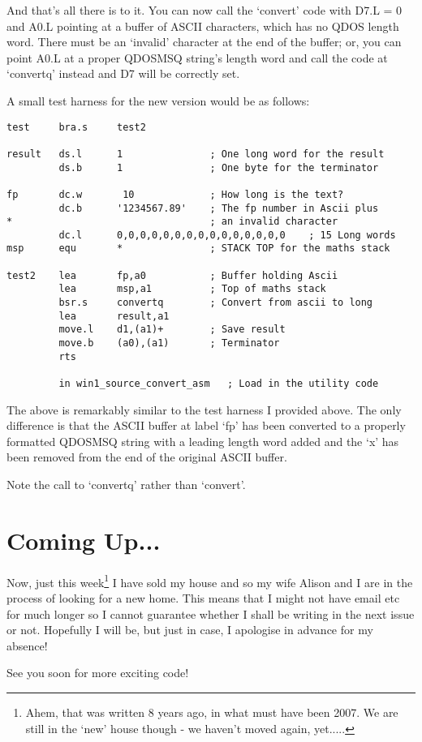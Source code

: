 And that's all there is to it. You can now call the `convert' code with D7.L = 0 and A0.L
pointing at a buffer of ASCII characters, which has no QDOS length word. There must be an `invalid' character at the end of the buffer; or, you can point A0.L at a proper QDOSMSQ string's length word and call the code at `convertq' instead and D7 will be correctly set.

A small test harness for the new version would be as follows:

\begin{lstlisting}[firstnumber=1,caption={Better ASCII to LONG Converter - Test Harness}]
test     bra.s     test2

result   ds.l      1               ; One long word for the result
         ds.b      1               ; One byte for the terminator

fp       dc.w       10             ; How long is the text?
         dc.b      '1234567.89'    ; The fp number in Ascii plus 
*                                  ; an invalid character
         dc.l      0,0,0,0,0,0,0,0,0,0,0,0,0,0,0    ; 15 Long words 
msp      equ       *               ; STACK TOP for the maths stack

test2    lea       fp,a0           ; Buffer holding Ascii
         lea       msp,a1          ; Top of maths stack
         bsr.s     convertq        ; Convert from ascii to long
         lea       result,a1
         move.l    d1,(a1)+        ; Save result
         move.b    (a0),(a1)       ; Terminator
         rts

         in win1_source_convert_asm   ; Load in the utility code
\end{lstlisting}

The above is remarkably similar to the test harness I provided above. The only difference
is that the ASCII buffer at label `fp' has been converted to a properly formatted QDOSMSQ
string with a leading length word added and the `x' has been removed from the end of the
original ASCII buffer.

Note the call to `convertq' rather than `convert'.

\section{Coming Up...}
\label{ch18-the-end}%

Now, just this week\footnote{Ahem, that was written 8 years ago, in what must have been 2007. We are still in the `new' house though - we haven't moved again, yet.....} I have sold my house and so my wife Alison and I are in the
process of looking for a new home. This means that I might not have email etc
for much longer so I cannot guarantee whether I shall be writing in the next
issue or not. Hopefully I will be, but just in case, I apologise in advance for
my absence!

See you soon for more exciting code!

